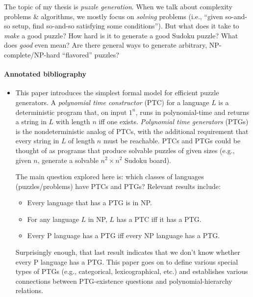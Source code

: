 \documentclass{extarticle}
\begin{document}
The topic of my thesis is \emph{puzzle generation}.  When we talk about
complexity problems \& algorithms, we mostly focus on \emph{solving} problems
(i.e., ``given so-and-so setup, find so-and-so satisfying some conditions'').
But what does it take to \emph{make} a good puzzle?  How hard is it to generate
a good Sudoku puzzle?  What does \emph{good} even mean?  Are there general ways
to generate arbitrary, NP-complete/NP-hard ``flavored'' puzzles?

\paragraph{Annotated bibliography}

\begin{itemize}

  \item {}

    \begin{annotation}
      This paper introduces the simplest formal model for efficient puzzle
      generators.  A \emph{polynomial time constructor} (PTC) for a language
      \(L\) is a deterministic program that, on input \(1^n\), runs in
      polynomial-time and returns a string in \(L\) with length \(n\) iff one
      exists.  \emph{Polynomial time generators} (PTGs) is the nondeterministic
      analog of PTCs, with the additional requirement that every string in
      \(L\) of length \(n\) must be reachable.  PTCs and PTGs could be thought
      of as programs that produce solvable puzzles of given sizes (e.g., given
      \(n\), generate a solvable \(n^2 \times n^2\) Sudoku board).

      The main question explored here is: which classes of languages
      (puzzles/problems) have PTCs and PTGs?  Relevant results include:
      \begin{itemize}
        \item Every language that has a PTG is in NP.
        \item For any language \(L\) in NP, \(L\) has a PTC iff it has a PTG.
        \item Every P language has a PTG iff every NP language has a PTG.
      \end{itemize}
      Surprisingly enough, that last result indicates that we don't know
      whether every P language has a PTG.  This paper goes on to define various
      special types of PTGs (e.g., categorical, lexicographical, etc.) and
      establishes various connections between PTG-existence questions and
      polynomial-hierarchy relations.
    \end{annotation}


\end{itemize}
\end{document}
